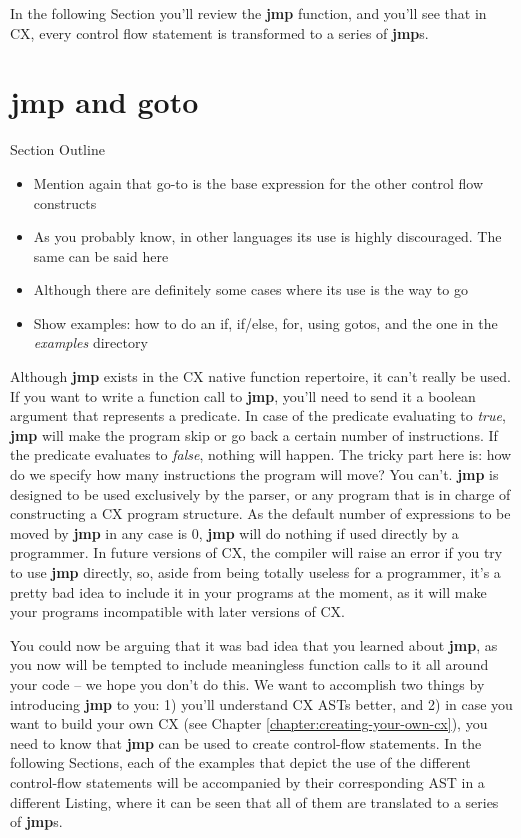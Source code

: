 \documentclass[11pt,fleqn,openany]{book} %
\begin{document}
In the following Section you'll review the \textbf{jmp} function, and you'll see that in CX, every control flow statement is transformed to a series of \textbf{jmp}s.

\section{jmp and goto}

\begin{remark}
Section Outline
    \begin{itemize}
    	\item Mention again that go-to is the base expression for the other control flow constructs
        \item As you probably know, in other languages its use is highly discouraged. The same can be said here
        \item Although there are definitely some cases where its use is the way to go
        \item Show examples: how to do an if, if/else, for, using gotos, and the one in the \textit{examples} directory
    \end{itemize}
\end{remark}

Although \textbf{jmp} exists in the CX native function repertoire, it can't really be used. If you want to write a function call to \textbf{jmp}, you'll need to send it a boolean argument that represents a predicate. In case of the predicate evaluating to \emph{true}, \textbf{jmp} will make the program skip or go back a certain number of instructions. If the predicate evaluates to \emph{false}, nothing will happen. The tricky part here is: how do we specify how many instructions the program will move? You can't. \textbf{jmp} is designed to be used exclusively by the parser, or any program that is in charge of constructing a CX program structure. As the default number of expressions to be moved by \textbf{jmp} in any case is 0, \textbf{jmp} will do nothing if used directly by a programmer. In future versions of CX, the compiler will raise an error if you try to use \textbf{jmp} directly, so, aside from being totally useless for a programmer, it's a pretty bad idea to include it in your programs at the moment, as it will make your programs incompatible with later versions of CX.

You could now be arguing that it was bad idea that you learned about \textbf{jmp}, as you now will be tempted to include meaningless function calls to it all around your code -- we hope you don't do this. We want to accomplish two things by introducing \textbf{jmp} to you: 1) you'll understand CX ASTs better, and 2) in case you want to build your own CX (see Chapter \ref{chapter:creating-your-own-cx}), you need to know that \textbf{jmp} can be used to create control-flow statements. In the following Sections, each of the examples that depict the use of the different control-flow statements will be accompanied by their corresponding AST in a different Listing, where it can be seen that all of them are translated to a series of \textbf{jmp}s.
\end{document}

